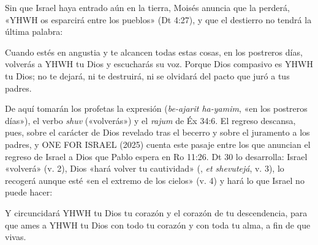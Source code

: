 Sin que Israel haya entrado aún en la tierra, Moisés anuncia que la perderá, «YHWH os esparcirá entre los pueblos» (Dt 4:27), y que el destierro no tendrá la última palabra:

\begin{cita}Cuando estés en angustia y te alcancen todas estas cosas, en los postreros días, volverás a YHWH tu Dios y escucharás su voz. Porque Dios compasivo es YHWH tu Dios; no te dejará, ni te destruirá, ni se olvidará del pacto que juró a tus padres.\end{cita}

De aquí tomarán los profetas la expresión  (\emph{be-ajarit ha-yamim}, «en los postreros días»), el verbo \emph{shuv} («volverás») y el \emph{rajum} de Éx 34:6. El regreso descansa, pues, sobre el carácter de Dios revelado tras el becerro y sobre el juramento a los padres, y ONE FOR ISRAEL (2025) cuenta este pasaje entre los que anuncian el regreso de Israel a Dios que Pablo espera en Ro 11:26. Dt 30 lo desarrolla: Israel «volverá» (v. 2), Dios «hará volver tu cautividad» (, \emph{et shevutejá}, v. 3), lo recogerá aunque esté «en el extremo de los cielos» (v. 4) y hará lo que Israel no puede hacer:

\begin{cita}Y circuncidará YHWH tu Dios tu corazón y el corazón de tu descendencia, para que ames a YHWH tu Dios con todo tu corazón y con toda tu alma, a fin de que vivas.\end{cita}

